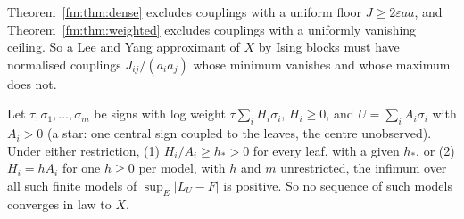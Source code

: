 Theorem~\ref{fm:thm:dense} excludes couplings with a uniform floor $J\ge2\varepsilon aa$, and Theorem~\ref{fm:thm:weighted} excludes couplings with a uniformly vanishing ceiling. So a Lee and Yang approximant of $X$ by Ising blocks must have normalised couplings $J_{ij}/(a_ia_j)$ whose minimum vanishes and whose maximum does not.

\begin{theorem}\label{fm:thm:central}
Let $\tau,\sigma_1,\dots,\sigma_m$ be signs with log weight $\tau\sum_iH_i\sigma_i$, $H_i\ge0$, and $U=\sum_iA_i\sigma_i$ with $A_i>0$ (a star: one central sign coupled to the leaves, the centre unobserved). Under either restriction, (1) $H_i/A_i\ge h_*>0$ for every leaf, with a given $h_*$, or (2) $H_i=hA_i$ for one $h\ge0$ per model, with $h$ and $m$ unrestricted, the infimum over all such finite models of $\sup_E|L_U-F|$ is positive. So no sequence of such models converges in law to $X$.
\end{theorem}

